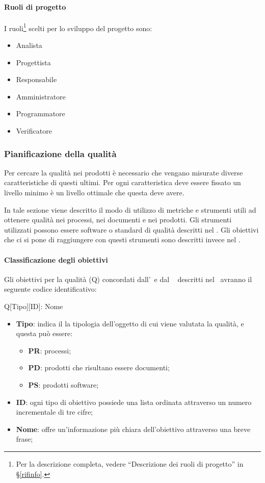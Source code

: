 			\paragraph{Ruoli di progetto}
			I ruoli\footnote{Per la descrizione completa, vedere ``Descrizione dei ruoli di progetto'' in \S\ref{rifinfo}.} scelti per lo sviluppo del progetto sono:
			\begin{itemize}[noitemsep]
				\item Analista
				\item Progettista
				\item Responsabile
				\item Amministratore
				\item Programmatore
				\item Verificatore
			\end{itemize}


		\subsubsection{Pianificazione della qualità}
		Per cercare la qualità nei prodotti è necessario che vengano misurate diverse caratteristiche di questi ultimi. Per ogni caratteristica deve essere fissato un livello minimo è un livello ottimale che questa deve avere.
		
		In tale sezione viene descritto il modo di utilizzo di metriche e strumenti utili ad ottenere qualità nei processi, nei documenti e nei prodotti. Gli strumenti utilizzati possono essere software o standard di qualità descritti nel \Doc{\PdQ}. Gli obiettivi che ci si pone di raggiungere con questi strumenti sono descritti invece nel \Doc{\PdQ}.
			
			\paragraph{Classificazione degli obiettivi}
			Gli obiettivi per la qualità (Q) concordati dall'\Amm~e dal \Ver~ descritti nel \PdQ~avranno il seguente codice identificativo:
			
			\begin{center}
				Q[Tipo][ID]: Nome
			\end{center}
		
			\begin{itemize}
				\item \textbf{Tipo}: indica il la tipologia dell'oggetto di cui viene valutata la qualità, e questa può essere:
				\begin{itemize}
					\item \textbf{PR}: processi;
					\item \textbf{PD}: prodotti che risultano essere documenti;
					\item \textbf{PS}: prodotti software;
				\end{itemize}
			
				\item \textbf{ID}: ogni tipo di obiettivo possiede una lista ordinata attraverso un numero incrementale di tre cifre;
				\item \textbf{Nome}: offre un'informazione più chiara dell'obiettivo attraverso una breve frase;
			\end{itemize}
		
